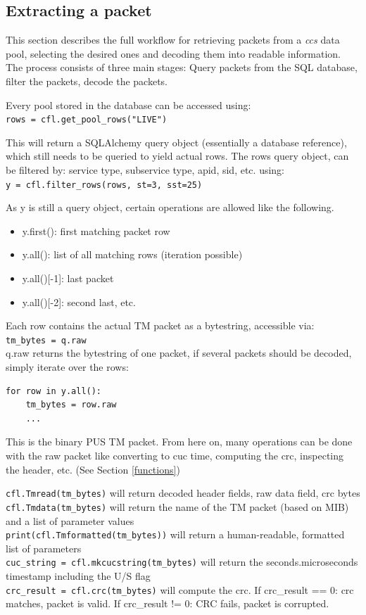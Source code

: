 \subsection{Extracting a packet}
This section describes the full workflow for retrieving packets from a \textit{ccs} data pool, selecting the desired ones and decoding them into readable information.
The process consists of three main stages: Query packets from the SQL database, filter the packets, decode the packets. 

Every pool stored in the database can be accessed using:\\
\texttt{rows = cfl.get\_pool\_rows("LIVE")}

This will return a SQLAlchemy query object (essentially a database reference), which still needs to be queried to yield actual rows. 
The rows query object, can be filtered by: service type, subservice type, apid, sid, etc. using: \\
\texttt{y = cfl.filter\_rows(rows, st=3, sst=25)}

As y is still a query object, certain operations are allowed like the following.

\begin{itemize}
    \item y.first(): first matching packet row
    \item y.all(): list of all matching rows (iteration possible)
    \item y.all()[-1]: last packet
    \item y.all()[-2]: second last, etc.
\end{itemize}

Each row contains the actual TM packet as a bytestring, accessible via:\\
\texttt{tm\_bytes = q.raw}\\

q.raw returns the bytestring of one packet, if several packets should be decoded, simply iterate over the rows:\\
\begin{verbatim}
for row in y.all():
    tm_bytes = row.raw
    ...
\end{verbatim}

This is the binary PUS TM packet. From here on, many operations can be done with the raw packet like converting to cuc time, computing the crc, inspecting the header, etc. (See Section \ref{functions})

\texttt{cfl.Tmread(tm\_bytes)} will return decoded header fields, raw data field, crc bytes \\
\texttt{cfl.Tmdata(tm\_bytes)} will return the name of the TM packet (based on MIB) and a list of parameter values\\
\texttt{print(cfl.Tmformatted(tm\_bytes))} will return a human-readable, formatted list of parameters \\
\texttt{cuc\_string = cfl.mkcucstring(tm\_bytes)} will return the seconds.microseconds timestamp including the U/S flag \\
\texttt{crc\_result = cfl.crc(tm\_bytes)} will compute the crc. If crc\_result == 0: crc matches, packet is valid. If crc\_result != 0: CRC fails, packet is corrupted.



